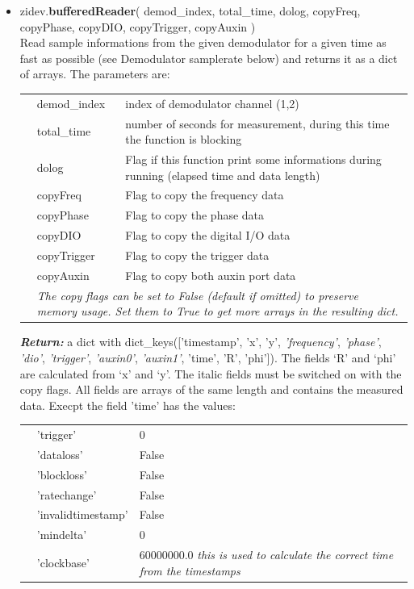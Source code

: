 \documentclass[11pt]{article} %
\begin{document}
\begin{itemize}
\item zidev.{\bf bufferedReader}( demod\_index, total\_time, dolog, copyFreq, copyPhase, copyDIO, copyTrigger, copyAuxin ) \\
	Read sample informations from the given demodulator for a given time as fast as possible (see Demodulator samplerate below) and returns it as a dict of arrays. The parameters are:
	\begin{longtable}{p{0.8cm}p{3.1cm}p{12cm}}
	&demod\_index & index of demodulator channel (1,2) \\
	&total\_time  & number of seconds for measurement, during this time the function is blocking \\
	&dolog & Flag if this function print some informations during running (elapsed time and data length) \\
	&copyFreq & Flag to copy the frequency data \\
	&copyPhase & Flag to copy the phase data \\
	&copyDIO & Flag to copy the digital I/O data \\
	&copyTrigger & Flag to copy the trigger data \\
	&copyAuxin & Flag to copy both auxin port data \\
	& \multicolumn{2}{p{15cm}}{\it The copy flags can be set to False (default if omitted) to preserve memory usage. Set them to True to get more arrays in the resulting dict.} \\
	\end{longtable}
	\textbf{\textit{Return:}} a dict with dict\_keys(['timestamp', 'x', 'y', {\it 'frequency'}, {\it 'phase'}, {\it 'dio'}, {\it 'trigger'}, {\it 'auxin0'}, {\it 'auxin1'}, 'time', 'R', 'phi']).
	The fields `R' and `phi' are calculated from `x' and `y'. The italic fields must be switched on with the copy flags. All fields are arrays of the same length and contains the measured data. Execpt the field 'time' has the values:
	\begin{longtable}{p{0.8cm}p{3.1cm}p{12cm}}
	&'trigger' & 0 \\
	&'dataloss' & False \\
	&'blockloss' & False \\
	&'ratechange' & False \\
	&'invalidtimestamp' & False \\
	&'mindelta' & 0 \\
	&'clockbase' & 60000000.0  {\it this is used to calculate the correct time from the timestamps} \\
	\end{longtable}


\end{itemize}
\end{document}

